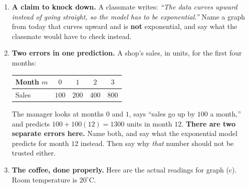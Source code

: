 \documentclass[10pt]{article}
\begin{document}
\boxguard[30]
\begin{tcolorbox}[colback=white, colframe=black!40, title=\textbf{Tier E --- Extension},
    fonttitle=\bfseries, arc=2mm, left=3mm, right=3mm, top=2mm, bottom=2mm, breakable]
\small

\begin{enumerate}[leftmargin=1.6em, itemsep=4pt, topsep=2pt]
  \item \textbf{A claim to knock down.} A classmate writes: \emph{``The data curves upward instead of
        going straight, so the model has to be exponential.''} Name a graph from today that curves
        upward and is \textbf{not} exponential, and say what the classmate would have to check
        instead.


  \item \textbf{Two errors in one prediction.} A shop's sales, in units, for the first four months:
\smallskip

\renewcommand{\arraystretch}{1.3}
\begin{center}
\begin{tabular}{@{}|l|c|c|c|c|@{}}
\hline
Month $m$ & $0$ & $1$ & $2$ & $3$ \\ \hline
Sales & $100$ & $200$ & $400$ & $800$ \\
\hline
\end{tabular}
\end{center}

The manager looks at months $0$ and $1$, says ``sales go up by $100$ a month,'' and predicts
$100+100(12)=1300$ units in month $12$. \textbf{There are two separate errors here.} Name both, and
say what the exponential model predicts for month $12$ instead. Then say why \emph{that} number
should not be trusted either.


\tcbbreak
  \item \textbf{The coffee, done properly.} Here are the actual readings for graph (c). Room
        temperature is $20^\circ$C.
\smallskip


\end{enumerate}
\end{tcolorbox}
\end{document}
